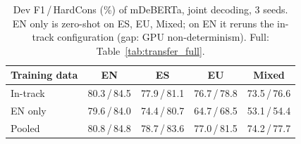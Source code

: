 \begin{table}[t]
\centering\small
\setlength{\tabcolsep}{2.5pt}
\begin{tabular}{@{}lcccc@{}}
\toprule
Training data & EN & ES & EU & Mixed \\
\midrule
In-track & 80.3\,/\,84.5 & 77.9\,/\,81.1 & 76.7\,/\,78.8 & 73.5\,/\,76.6 \\
EN only & 79.6\,/\,84.0 & 74.4\,/\,80.7 & 64.7\,/\,68.5 & 53.1\,/\,54.4 \\
Pooled & 80.8\,/\,84.8 & 78.7\,/\,83.6 & 77.0\,/\,81.5 & 74.2\,/\,77.7 \\
\bottomrule
\end{tabular}
\caption{Dev F1\,/\,HardCons (\%) of mDeBERTa, joint decoding, 3 seeds. EN only is zero-shot on ES, EU, Mixed; on EN it reruns the in-track configuration (gap: GPU non-determinism). Full: Table~\ref{tab:transfer_full}.}
\label{tab:transfer}
\end{table}
